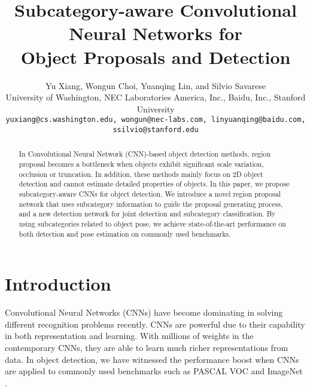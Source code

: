 \documentclass[10pt,twocolumn,letterpaper]{article}
\begin{document}
	
\title{Subcategory-aware Convolutional Neural Networks for \\ Object Proposals and Detection}



\author{Yu Xiang, Wongun Choi, Yuanqing Lin, and Silvio Savarese\\
	University of Washington,  NEC Laboratories America, Inc., Baidu, Inc., Stanford University \\
	{\tt\small yuxiang@cs.washington.edu, wongun@nec-labs.com, linyuanqing@baidu.com, ssilvio@stanford.edu}
}

\maketitle
\ifwacvfinal\thispagestyle{empty}\fi

\begin{abstract}
	
In Convolutional Neural Network (CNN)-based object detection methods, region proposal becomes a bottleneck when objects exhibit significant scale variation, occlusion or truncation. In addition, these methods mainly focus on 2D object detection and cannot estimate detailed properties of objects. In this paper, we propose subcategory-aware CNNs for object detection. We introduce a novel region proposal network that uses subcategory information to guide the proposal generating process, and a new detection network for joint detection and subcategory classification. By using subcategories related to object pose, we achieve state-of-the-art performance on both detection and pose estimation on commonly used benchmarks.

\end{abstract}

\vspace{-4mm}
\section{Introduction}

Convolutional Neural Networks (CNNs) have become dominating in solving different recognition problems recently. CNNs are powerful due to their capability in both representation and learning. With millions of weights in the contemporary CNNs, they are able to learn much richer representations from data. In object detection, we have witnessed the performance boost when CNNs \cite{krizhevsky2012imagenet,simonyan2014very} are applied to commonly used benchmarks such as PASCAL VOC \cite{pascal-voc-2012} and ImageNet \cite{ILSVRC15}.
\end{document}
